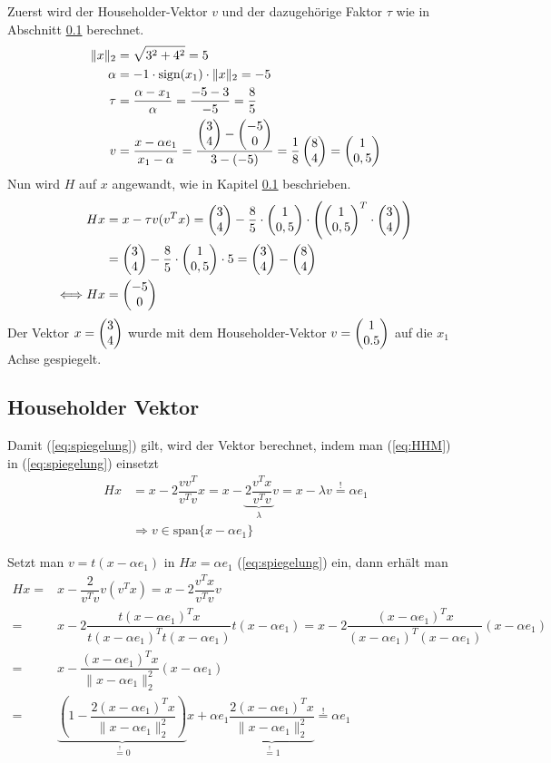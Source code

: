 Zuerst wird der Householder-Vektor $v$ und der dazugehörige Faktor $\tau$ wie in Abschnitt \ref{sec:HHvec} berechnet.
\begin{align*}
	\|x\|_2 &= \sqrt{3^2 + 4^2} = 5\\
	\alpha &= -1 \cdot \text{sign}(x_1) \cdot \|x\|_2 = -5 \\
	\tau &= \dfrac{\alpha - x_1}{\alpha} = \dfrac{-5 - 3}{-5} = \dfrac{8}{5} \\
	v &=\dfrac{x - \alpha e_1}{x_1 - \alpha} = \dfrac{\begin{pmatrix} 3\\4 \end{pmatrix} - \begin{pmatrix} -5\\0 \end{pmatrix}}{3- (-5)} = \dfrac{1}{8} \begin{pmatrix} 8\\4 \end{pmatrix} = \begin{pmatrix} 1\\0,5 \end{pmatrix}
\end{align*}
Nun wird $H$ auf $x$ angewandt, wie in Kapitel \ref{sec:HHvec} beschrieben.
\begin{align*}
	Hx &= x - \tau v (v^T x) = \begin{pmatrix} 3\\4 \end{pmatrix} - \dfrac{8}{5} \cdot \begin{pmatrix} 1\\0,5 \end{pmatrix} \cdot \left(  \begin{pmatrix} 1\\0,5 \end{pmatrix}^T \cdot \begin{pmatrix} 3\\4 \end{pmatrix} \right)\\
	&= \begin{pmatrix} 3\\4 \end{pmatrix} - \dfrac{8}{5} \cdot \begin{pmatrix} 1\\0,5 \end{pmatrix} \cdot 5 = \begin{pmatrix} 3\\4 \end{pmatrix} - \begin{pmatrix} 8\\4 \end{pmatrix} \\
	\Longleftrightarrow Hx&= \begin{pmatrix} -5\\0 \end{pmatrix}
\end{align*}
Der Vektor $x = \begin{pmatrix} 3\\4 \end{pmatrix}$ wurde mit dem Householder-Vektor $v= \begin{pmatrix} 1\\0.5 \end{pmatrix}$ auf die $x_1$ Achse gespiegelt.

\subsection{Householder Vektor} \label{sec:HHvec}
Damit (\ref{eq:spiegelung}) gilt, wird der Vektor berechnet, 
indem man (\ref{eq:HHM}) in (\ref{eq:spiegelung}) einsetzt
\begin{align*}
Hx &= x - 2\dfrac{vv^T}{v^Tv} x = x - \underbrace{2\dfrac{v^Tx}{v^Tv}}_{\lambda} v = x - \lambda v \overset{!}{=} \alpha e_1 \\
&\Longrightarrow v \in \text{span}\{x - \alpha e_1\}
\end{align*}

Setzt man $v = t(x - \alpha e_1)$ in $Hx = \alpha e_1 $ (\ref{eq:spiegelung}) ein, dann erhält man 
\begin{align}
Hx =& x - \dfrac{2}{v^Tv}v(v^Tx) = x - 2\dfrac{v^Tx}{v^Tv}v \nonumber \\
=& x - 2\dfrac{ t(x - \alpha e_1)^Tx}{ t(x - \alpha e_1)^T t(x - \alpha e_1)} t(x - \alpha e_1)
= x - 2\dfrac{ (x - \alpha e_1)^Tx}{ (x - \alpha e_1)^T (x - \alpha e_1)} (x - \alpha e_1)
\nonumber \\
=& x - \dfrac{(x - \alpha e_1)^Tx}{\|x - \alpha e_1\|_2^2} (x - \alpha e_1) \nonumber \\
=&\underbrace{\left(1 - \dfrac{2(x - \alpha e_1)^Tx}{\|x - \alpha e_1\|_2^2}\right)}_{ \overset{!}{=} 0 } x + \alpha e_1 \underbrace{\dfrac{2(x - \alpha e_1)^Tx}{\|x - \alpha e_1\|_2^2} }_{\overset{!}{=} 1} \overset{!}{=} \alpha e_1 \label{lasteq}
\end{align}

